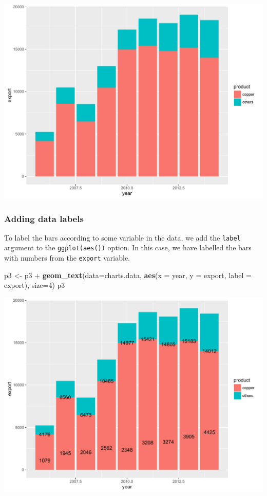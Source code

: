 \documentclass[]{article}
\newenvironment{Shaded}{\begin{snugshade}}{\end{snugshade}}
\newcommand{\KeywordTok}[1]{\textcolor[rgb]{0.13,0.29,0.53}{\textbf{{#1}}}}
\newcommand{\DataTypeTok}[1]{\textcolor[rgb]{0.13,0.29,0.53}{{#1}}}
\newcommand{\DecValTok}[1]{\textcolor[rgb]{0.00,0.00,0.81}{{#1}}}
\newcommand{\StringTok}[1]{\textcolor[rgb]{0.31,0.60,0.02}{{#1}}}
\newcommand{\NormalTok}[1]{{#1}}
\begin{document}
\begin{center}\includegraphics{0_all_posts_pdf/bar_1-1} \end{center}

\subsubsection{Adding data labels}\label{adding-data-labels}

To label the bars according to some variable in the data, we add the
\texttt{label} argument to the \texttt{ggplot(aes())} option. In this
case, we have labelled the bars with numbers from the \texttt{export}
variable.

\begin{Shaded}
\begin{Highlighting}[]
\NormalTok{p3 <-}\StringTok{ }\NormalTok{p3 +}\StringTok{ }\KeywordTok{geom_text}\NormalTok{(}\DataTypeTok{data=}\NormalTok{charts.data, }\KeywordTok{aes}\NormalTok{(}\DataTypeTok{x =} \NormalTok{year, }\DataTypeTok{y =} \NormalTok{export, }\DataTypeTok{label =} \NormalTok{export), }\DataTypeTok{size=}\DecValTok{4}\NormalTok{)}
\NormalTok{p3}
\end{Highlighting}
\end{Shaded}

\begin{center}\includegraphics{0_all_posts_pdf/bar_2-1} \end{center}
\end{document}
